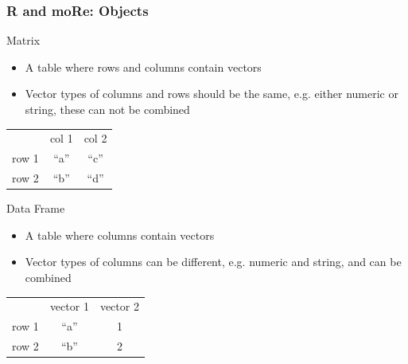 \documentclass{beamer}
\begin{document}


\begin{frame}
\frametitle{R and moRe: Objects}
\begin{block}{Matrix}
\begin{itemize}
\item A table where rows and columns contain vectors
\item Vector types of columns and rows should be the same, e.g. either numeric or string, these can not be combined 
\end{itemize}
\begin{tabular} {c c c}
 & \alert{col 1} & \alert{col 2}\\
\alert{row 1} & \alert{``a''} & \alert{``c''}\\
\alert{row 2} & \alert{``b''} & \alert{``d''}\\
\end{tabular}
\end{block}
\pause
\begin{block}{Data Frame}
\begin{itemize}
\item A table where columns contain vectors
\item Vector types of columns can be different, e.g. numeric and string, and can be combined 
\end{itemize}
\begin{tabular} {c c c}
 & \alert{vector 1} & \alert{vector 2}\\
\alert{row 1} & \alert{``a''} & \alert{1}\\
\alert{row 2} & \alert{``b''} & \alert{2}\\
\end{tabular}
\end{block}
\end{frame}

\end{document}
